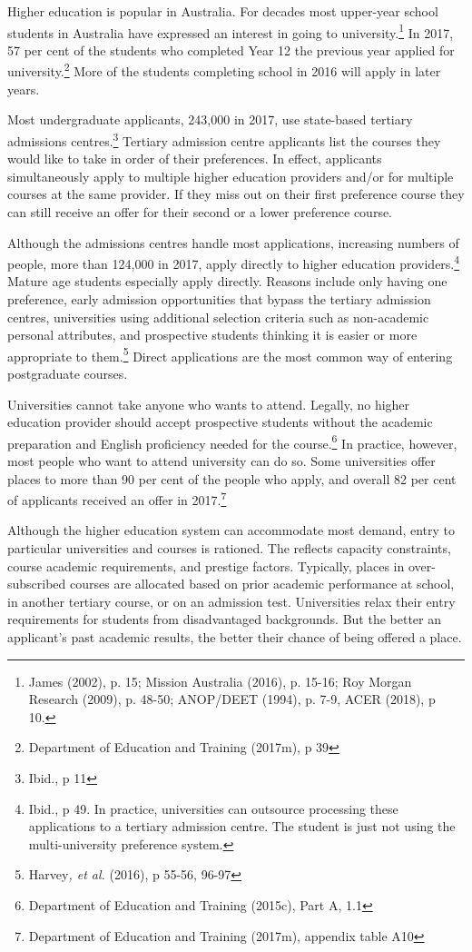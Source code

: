 \documentclass{grattan}
\begin{document}
Higher education is popular in Australia. For decades most upper-year school students in Australia have expressed an interest in going to university.\footnote{James (2002), p. 15; Mission Australia (2016), p. 15-16; Roy Morgan Research (2009), p. 48-50; ANOP/DEET (1994), p. 7-9, ACER (2018), p 10.} In 2017, 57 per cent of the students who completed Year 12 the previous year applied for university.\footnote{Department of Education and Training (2017m), p 39} More of the students completing school in 2016 will apply in later years.

Most undergraduate applicants, 243,000 in 2017, use state-based tertiary admissions centres.\footnote{Ibid., p 11} Tertiary admission centre applicants list the courses they would like to take in order of their preferences. In effect, applicants simultaneously apply to multiple higher education providers and/or for multiple courses at the same provider. If they miss out on their first preference course they can still receive an offer for their second or a lower preference course.

Although the admissions centres handle most applications, increasing numbers of people, more than 124,000 in 2017, apply directly to higher education providers.\footnote{Ibid., p 49. In practice, universities can outsource processing these applications to a tertiary admission centre. The student is just not using the multi-university preference system.} Mature age students especially apply directly. Reasons include only having one preference, early admission opportunities that bypass the tertiary admission centres, universities using additional selection criteria such as non-academic personal attributes, and prospective students thinking it is easier or more appropriate to them.\footnote{Harvey\emph{, et al.} (2016), p 55-56, 96-97} Direct applications are the most common way of entering postgraduate courses.

Universities cannot take anyone who wants to attend. Legally, no higher education provider should accept prospective students without the academic preparation and English proficiency needed for the course.\footnote{Department of Education and Training (2015c), Part A, 1.1} In practice, however, most people who want to attend university can do so. Some universities offer places to more than 90 per cent of the people who apply, and overall 82 per cent of applicants received an offer in 2017.\footnote{Department of Education and Training (2017m), appendix table A10}

Although the higher education system can accommodate most demand, entry to particular universities and courses is rationed. The reflects capacity constraints, course academic requirements, and prestige factors. Typically, places in over-subscribed courses are allocated based on prior academic performance at school, in another tertiary course, or on an admission test. Universities relax their entry requirements for students from disadvantaged backgrounds. But the better an applicant's past academic results, the better their chance of being offered a place.
\end{document}
